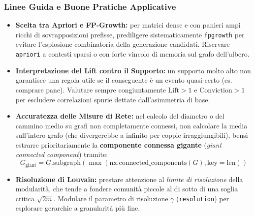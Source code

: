 \subsubsection{Linee Guida e Buone Pratiche Applicative}
\begin{itemize}
    \item \textbf{Scelta tra Apriori e FP-Growth:} per matrici dense e con panieri ampi ricchi di sovrapposizioni prefisse, prediligere sistematicamente \texttt{fpgrowth} per evitare l'esplosione combinatoria della generazione candidati. Riservare \texttt{apriori} a contesti sparsi o con forte vincolo di memoria sul grafo dell'albero.
    \item \textbf{Interpretazione del Lift contro il Supporto:} un supporto molto alto non garantisce una regola utile se il conseguente è un evento quasi-certo (es. comprare pane). Valutare sempre congiuntamente $\text{Lift} > 1$ e $\text{Conviction} > 1$ per escludere correlazioni spurie dettate dall'asimmetria di base.
    \item \textbf{Accuratezza delle Misure di Rete:} nel calcolo del diametro o del cammino medio su grafi non completamente connessi, non calcolare la media sull'intero grafo (che divergerebbe a infinito per coppie irraggiungibili), bensì estrarre prioritariamente la \textbf{componente connessa gigante} (\textit{giant connected component}) tramite:
    \begin{equation*}
        G_{\text{giant}} = G.\text{subgraph}(\max(\text{nx.connected\_components}(G), \text{key}=\text{len}))
    \end{equation*}
    \item \textbf{Risoluzione di Louvain:} prestare attenzione al \textit{limite di risoluzione} della modularità, che tende a fondere comunità piccole al di sotto di una soglia critica $\sqrt{2m}$. Modulare il parametro di risoluzione $\gamma$ (\texttt{resolution}) per esplorare gerarchie a granularità più fine.
\end{itemize}
